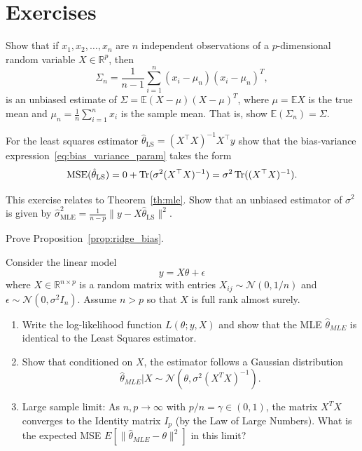 \section*{Exercises}


\begin{myexercise}
 Show that if $x_1,x_2,\ldots, x_n$ are $n$ independent observations of a $p$-dimensional random variable
$X\in \mathbb{R}^p$, then
$$\Sigma_n = \frac{1}{n-1}\sum_{i=1}^n (x_i-\mu_n)(x_i-\mu_n)^T,$$
is an unbiased estimate of $\Sigma = \mathbb{E}(X-\mu)(X-\mu)^T$, where $\mu = \mathbb{E}X$ is the true mean and $\mu_n = \frac{1}{n} \sum_{i=1}^n x_i$ is the sample mean. That is, show $\mathbb{E}(\Sigma_n) = \Sigma$.
    
\end{myexercise}



\begin{myexercise}\label{ex:ols_bias_variance}
For the  least squares estimator $\hat{\theta}_{\text{LS}} = (X^\top X)^{-1}X^\top y$ show that the
bias-variance expression~\eqref{eq:bias_variance_param}  takes the form
$$\operatorname{MSE}(\hat{\theta}_{\text{LS}}) = 0 + \operatorname{Tr}(\sigma^2(X^\top X)^{-1}) 
= \sigma^2\operatorname{Tr}((X^\top X)^{-1}).$$
\end{myexercise}


\begin{myexercise}\label{ex:mse_unbiased}
This exercise relates to Theorem~\ref{th:mle}. Show that
an unbiased estimator of $\sigma^2$ is given by
$\hat{\sigma}^2_{\text{MLE}} = \frac{1}{n-p}\|y - X\hat{\theta}_{\text{LS}}\|^2$.
\end{myexercise}


\begin{myexercise}\label{ex:ridge_bias}
Prove Proposition~\ref{prop:ridge_bias}.
\end{myexercise}

\begin{myexercise}
Consider the linear model
$$y = X\theta + \epsilon$$
where $X \in \mathbb{R}^{n \times p}$ is a random matrix with entries $X_{ij} \sim \mathcal{N}(0, 1/n)$ and $\epsilon \sim \mathcal{N}(0, \sigma^2 I_n)$. Assume $n > p$ so that $X$ is full rank almost surely.
\begin{enumerate}
\item 
Write the log-likelihood function $L(\theta; y, X)$ and show that the MLE $\hat{\theta}_{MLE}$ is identical to the  Least Squares  estimator.
\item
Show that conditioned on $X$, the estimator follows a Gaussian distribution
$$\hat{\theta}_{MLE} | X \sim \mathcal{N}(\theta, \sigma^2 (X^T X)^{-1}).$$
\item Large sample limit: As $n, p \to \infty$ with $p/n = \gamma \in (0, 1)$, the matrix $X^T X$ converges to the Identity matrix $I_p$ (by the Law of Large Numbers). What is the expected MSE $E[\|\hat{\theta}_{MLE} - \theta\|^2]$ in this limit?
\end{enumerate}

\end{myexercise}


